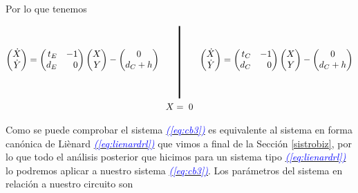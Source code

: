 \documentclass[12pt,a4paper]{report} %
\newcommand{\eref}[1]{\hyperref[#1]{\textcolor{blue}{\textit{(\ref*{#1})}}}}
\begin{document}
	\vspace{0.5cm}\noindent Por lo que tenemos
	
	\begin{equation}
		\label{eq:cb3}
		\begin{gathered}
			\begin{pmatrix*}[r]
				\dot{X}\\ \dot{Y}
			\end{pmatrix*}= \begin{pmatrix*}[r]
				t_E & -1 \\ d_E & 0
			\end{pmatrix*} \begin{pmatrix*}[r]
				X \\ Y
			\end{pmatrix*}-\begin{pmatrix*}[c]
				0 \\ d_C+h
			\end{pmatrix*} \qquad 
			\rule[-40pt]{1.5pt}{80pt} \qquad 
				\begin{pmatrix*}[r]
				\dot{X}\\ \dot{Y}
			\end{pmatrix*}= \begin{pmatrix*}[r]
				t_C & -1 \\ d_C & 0
			\end{pmatrix*} \begin{pmatrix*}[r]
				X \\ Y
			\end{pmatrix*}-\begin{pmatrix*}[c]
				0 \\ d_C+h
			\end{pmatrix*} \\ X=\;0
		\end{gathered}
	\end{equation}\smallskip
	
	\newpage
	
	\vspace{0.5cm} \noindent Como se puede comprobar el sistema \eref{eq:cb3} es equivalente al sistema en forma canónica de Liènard \eref{eq:lienardrl} que vimos a final de la Sección \ref{sistrobiz}, por lo que todo el análisis posterior que hicimos para un sistema tipo \eref{eq:lienardrl} lo podremos aplicar a nuestro sistema \eref{eq:cb3}. Los parámetros del sistema en relación a nuestro circuito son
	
\end{document}
